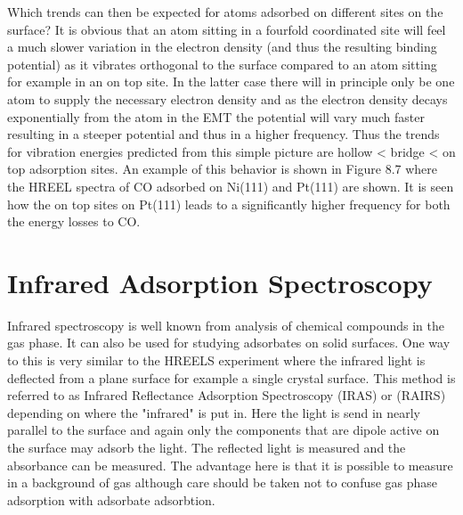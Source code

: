 Which trends can then be expected for atoms adsorbed on different sites on the surface? It is obvious that an atom sitting in a fourfold coordinated site will feel a much slower variation in the electron density (and thus the resulting binding potential) as it vibrates orthogonal to the surface compared to an atom sitting for example in an  on top site. In the  latter case there will in principle  only be  one atom to supply the necessary electron density and as the electron density decays exponentially from the atom in the EMT the potential will vary much faster resulting in a steeper potential and thus in a higher frequency.  Thus the trends for vibration energies  predicted from this simple picture are hollow < bridge < on top adsorption sites.
An example of this behavior is shown in Figure 8.7 where the HREEL spectra of CO adsorbed on Ni(111) and Pt(111) are shown.  It is seen how the on top sites on Pt(111) leads to a significantly higher frequency for both the energy losses to CO.

\section{Infrared Adsorption Spectroscopy}
Infrared spectroscopy is well known from analysis of chemical compounds in the gas phase. It can also be used for studying adsorbates on solid surfaces. One way to this is very similar to the HREELS experiment where the infrared light is deflected from a plane surface for example a single crystal surface.  This method is referred to as Infrared Reflectance Adsorption Spectroscopy (IRAS) or (RAIRS) depending on where the "infrared" is put in. Here the light is send in nearly parallel to the surface and again only the components that are dipole active on the surface may adsorb the light. The reflected light is measured and the absorbance can be measured. The advantage here is that it is possible to measure in a background of gas although care should be taken not to confuse gas phase adsorption  with adsorbate adsorbtion. 

